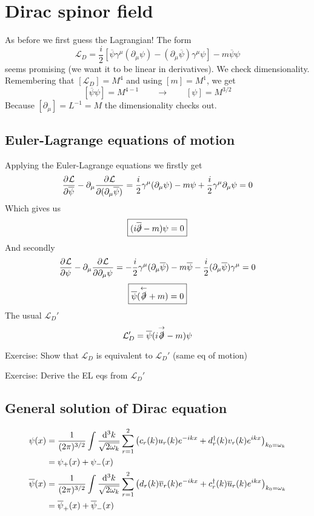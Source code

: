 \section{Dirac spinor field}

As before we first guess the Lagrangian! The form
\[ \mathcal{L}_D = \frac{i}{2}\left[\overline{\psi}\gamma^\mu(\partial_\mu\psi) - (\partial_\mu\overline{\psi})\gamma^\mu\psi\right] - m\overline{\psi}\psi\]
seems promising (we want it to be linear in derivatives). We check dimensionality. Remembering that $[\mathcal{L}_D] = M^4$ and using $[m] = M^1$, we get
\[ [\overline{\psi}\psi] = M^{4-1} \qquad \to \qquad [\psi] = M^{3/2}  \]
Because $[\partial_\mu] = L^{-1} = M$ the dimensionality checks out.


\subsection{Euler-Lagrange equations of motion}
Applying the Euler-Lagrange equations we firstly get
\[  \frac{\partial{^{}}\mathcal{L}}{\partial{{\overline{\psi}}^{}}}  - \partial_\mu \frac{\partial{^{}}\mathcal{L}}{\partial{{(\partial_\mu\overline{\psi})}^{}}}  = \frac{i}{2}\gamma^\mu(\partial_\mu\psi)-m\psi + \frac{i}{2}\gamma^\mu\partial_\mu\psi = 0 \]
Which gives us
\[ \boxed{(i\overline{\slashed{\partial}}-m)\psi = 0} \]
And secondly
\[  \frac{\partial{^{}}\mathcal{L}}{\partial{{\psi}^{}}}  - \partial_\mu \frac{\partial{^{}}\mathcal{L}}{\partial{{\partial_\mu\psi}^{}}}  = -\frac{i}{2}\gamma^\mu(\partial_\mu\overline{\psi})-m\overline{\psi} - \frac{i}{2}(\partial_\mu\overline{\psi})\gamma^\mu = 0 \]
\[ \boxed{\overline{\psi}(\overset{\leftarrow}{\slashed{\partial}}+m) = 0} \]
The usual $\mathcal{L}_D'$
\[ \mathcal{L}_D' = \overline{\psi}(i\overset{\rightarrow}{\slashed{\partial}}-m)\psi \]

\begin{example}
Exercise: Show that $\mathcal{L}_D$ is equivalent to $\mathcal{L}_D'$ (same eq of motion)

Exercise: Derive the EL eqs from $\mathcal{L}_D'$
\end{example}

\subsection{General solution of Dirac equation}
\begin{align*}
\psi(x) &= \frac{1}{(2\pi)^{3/2}}\int \frac{\operatorname{d \!}{^3k}}{\sqrt{2\omega_k}}\sum_{r=1}^2 \left(c_r(k)u_r(k)e^{-ikx}+d^\dagger_r(k)v_r(k)e^{ikx}\right)_{k_0=\omega_k} \\
&= \psi_+(x) + \psi_-(x) \\
\overline{\psi}(x) &= \frac{1}{(2\pi)^{3/2}} \int \frac{\operatorname{d \!}{^3k}}{\sqrt{2\omega_k}}\sum^2_{r=1}\left(d_r(k)\overline{v}_r(k)e^{-ikx} + c^\dagger_r(k)\overline{u}_r(k)e^{ikx}\right)_{k_0=\omega_k} \\
&= \overline{\psi}_+(x) + \overline{\psi}_-(x)
\end{align*}

